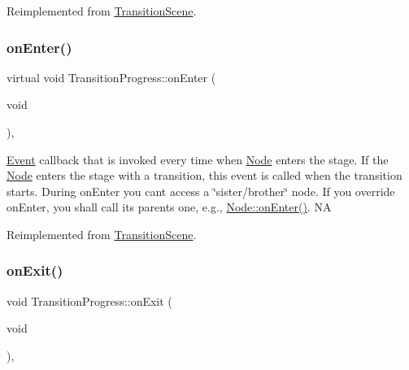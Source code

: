 Reimplemented from \hyperlink{classTransitionScene_aace390a1bd8f3c73bb650a1e256a0f83}{Transition\+Scene}.

\mbox{\label{classTransitionProgress_aa3ccb7515691f10b5410b75d912e2b68}} 
\subsubsection{\texorpdfstring{on\+Enter()}{onEnter()}\hspace{0.1cm}{\footnotesize\ttfamily [2/2]}}
{\footnotesize\ttfamily virtual void Transition\+Progress\+::on\+Enter (\begin{DoxyParamCaption}\item[{void}]{ }\end{DoxyParamCaption})\hspace{0.3cm}{\ttfamily [override]}, {\ttfamily [virtual]}}

\hyperlink{classEvent}{Event} callback that is invoked every time when \hyperlink{classNode}{Node} enters the \textquotesingle{}stage\textquotesingle{}. If the \hyperlink{classNode}{Node} enters the \textquotesingle{}stage\textquotesingle{} with a transition, this event is called when the transition starts. During on\+Enter you can\textquotesingle{}t access a \char`\"{}sister/brother\char`\"{} node. If you override on\+Enter, you shall call its parent\textquotesingle{}s one, e.\+g., \hyperlink{classNode_a7f51764c4afd5018a052b9ef71c03374}{Node\+::on\+Enter()}.  NA 

Reimplemented from \hyperlink{classTransitionScene_aace390a1bd8f3c73bb650a1e256a0f83}{Transition\+Scene}.

\mbox{\label{classTransitionProgress_a19b22f6e9a1d4e48d1d4b61e17fec363}} 
\subsubsection{\texorpdfstring{on\+Exit()}{onExit()}\hspace{0.1cm}{\footnotesize\ttfamily [1/2]}}
{\footnotesize\ttfamily void Transition\+Progress\+::on\+Exit (\begin{DoxyParamCaption}\item[{void}]{ }\end{DoxyParamCaption})\hspace{0.3cm}{\ttfamily [override]}, {\ttfamily [virtual]}}

